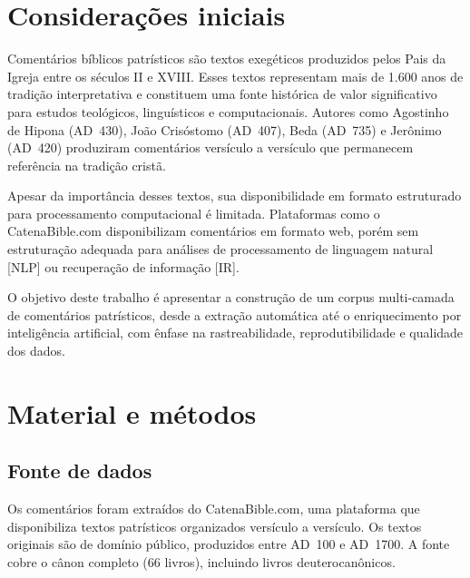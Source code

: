 \documentclass[11pt,a4paper]{article}
\begin{document}
\section{Considera\c{c}\~{o}es iniciais}

Coment\'{a}rios b\'{i}blicos patr\'{i}sticos s\~{a}o textos exeg\'{e}ticos produzidos pelos Pais da Igreja entre os s\'{e}culos II e XVIII. Esses textos representam mais de 1.600 anos de tradi\c{c}\~{a}o interpretativa e constituem uma fonte hist\'{o}rica de valor significativo para estudos teol\'{o}gicos, lingu\'{i}sticos e computacionais. Autores como Agostinho de Hipona (AD~430), Jo\~{a}o Cris\'{o}stomo (AD~407), Beda (AD~735) e Jer\^{o}nimo (AD~420) produziram coment\'{a}rios vers\'{i}culo a vers\'{i}culo que permanecem referência na tradi\c{c}\~{a}o crist\~{a}.

Apesar da import\^{a}ncia desses textos, sua disponibilidade em formato estruturado para processamento computacional \'{e} limitada. Plataformas como o CatenaBible.com disponibilizam coment\'{a}rios em formato web, por\'{e}m sem estrutura\c{c}\~{a}o adequada para an\'{a}lises de processamento de linguagem natural [NLP] ou recupera\c{c}\~{a}o de informa\c{c}\~{a}o [IR].

O objetivo deste trabalho \'{e} apresentar a constru\c{c}\~{a}o de um corpus multi-camada de coment\'{a}rios patr\'{i}sticos, desde a extra\c{c}\~{a}o autom\'{a}tica at\'{e} o enriquecimento por intelig\^{e}ncia artificial, com \^{e}nfase na rastreabilidade, reprodutibilidade e qualidade dos dados.

\section{Material e m\'{e}todos}

\subsection{Fonte de dados}

Os coment\'{a}rios foram extra\'{i}dos do CatenaBible.com, uma plataforma que disponibiliza textos patr\'{i}sticos organizados vers\'{i}culo a vers\'{i}culo. Os textos originais s\~{a}o de dom\'{i}nio p\'{u}blico, produzidos entre AD~100 e AD~1700. A fonte cobre o c\^{a}non completo (66 livros), incluindo livros deuterocan\^{o}nicos.
\end{document}
